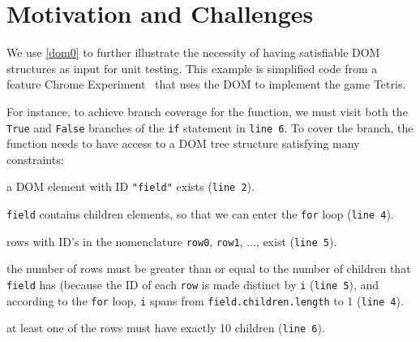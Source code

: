 \section{Motivation and Challenges}
We use \autoref{dom0} to further illustrate the necessity of having satisfiable DOM structures as input for \js unit testing.
This example is simplified code from a feature Chrome Experiment~\cite{domtris} that uses the DOM to implement the game Tetris.  

%
For instance, to achieve branch coverage for the  function, we must visit both the {\tt True} and {\tt False} branches of the {\tt if} statement in {\tt line 6}.
To cover the  branch, the function  needs to have access to a DOM tree structure satisfying many constraints:
\\
\begin{sloppy}
\begin {compactitem}
\item a DOM element with ID {\tt "field"} exists ({\tt line 2}).
\item {\tt field} contains children elements, so that we can  enter the {\tt for} loop ({\tt line 4}).
\item rows with ID's in the nomenclature {\tt row0}, {\tt row1}, $\dots$, exist ({\tt line 5}).
\item the number of rows must be greater than or equal to the number of children that {\tt field} has (because the ID of each {\tt row} is made distinct by {\tt i} ({\tt line 5}),   and according to the {\tt for} loop, {\tt i} spans from {\tt field.children.length} to 1 ({\tt line 4}).
\item at least one of the rows must have exactly 10 children ({\tt line 6}).
\end {compactitem}
\end{sloppy}

